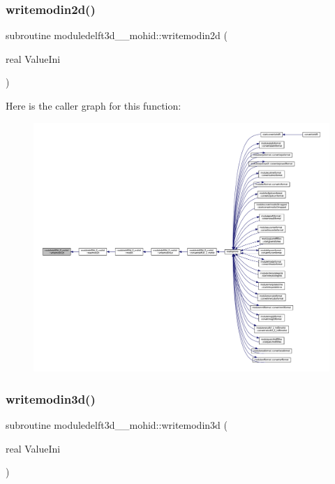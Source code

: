 \subsubsection{\texorpdfstring{writemodin2d()}{writemodin2d()}}
{\footnotesize\ttfamily subroutine moduledelft3d\+\_\+\_\+mohid\+::writemodin2d (\begin{DoxyParamCaption}\item[{real}]{Value\+Ini }\end{DoxyParamCaption})\hspace{0.3cm}{\ttfamily [private]}}

Here is the caller graph for this function\+:\nopagebreak
\begin{figure}[H]
\begin{center}
\leavevmode
\includegraphics[width=350pt]{namespacemoduledelft3d__2__mohid_a80eedb762138913565ab5df14043c948_icgraph}
\end{center}
\end{figure}
\mbox{\label{namespacemoduledelft3d__2__mohid_a5d66acc218cfe348245b89e3e6fac2f2}} 
\subsubsection{\texorpdfstring{writemodin3d()}{writemodin3d()}}
{\footnotesize\ttfamily subroutine moduledelft3d\+\_\+\_\+mohid\+::writemodin3d (\begin{DoxyParamCaption}\item[{real}]{Value\+Ini }\end{DoxyParamCaption})\hspace{0.3cm}{\ttfamily [private]}}

